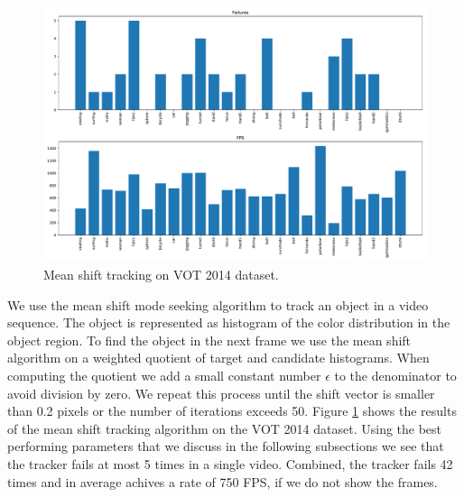 \documentclass[9pt]{IEEEtran}
\begin{document}
\begin{figure}[h]
    \centering
    \includegraphics[width=1\columnwidth]{vot_performance.pdf}
    \caption{Mean shift tracking on VOT 2014 dataset.}
    \label{fig:mean_shift_tracking}
\end{figure}
We use the mean shift mode seeking algorithm to track an object in a video sequence.
The object is represented as histogram of the color distribution in the object region.
To find the object in the next frame we use the mean shift algorithm on a weighted quotient of target and candidate histograms.
When computing the quotient we add a small constant number $\epsilon$ to the denominator to avoid division by zero.
We repeat this process until the shift vector is smaller than 0.2 pixels or the number of iterations exceeds 50.
Figure \ref{fig:mean_shift_tracking} shows the results of the mean shift tracking algorithm on the VOT 2014 dataset.
Using the best performing parameters that we discuss in the following subsections we see that the tracker fails at most 5 times in a single video.
Combined, the tracker fails 42 times and in average achives a rate of 750 FPS, if we do not show the frames. 
\end{document}
